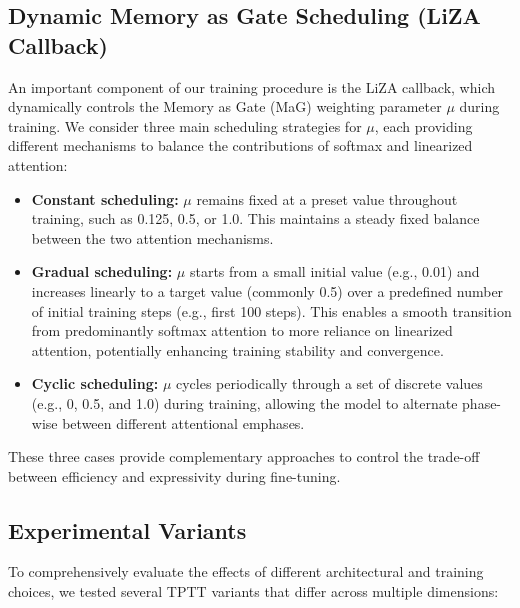 \documentclass[10pt,a4paper]{article}
\begin{document}
\subsection{Dynamic Memory as Gate Scheduling (LiZA Callback)}

An important component of our training procedure is the LiZA callback, which dynamically controls the Memory as Gate (MaG) weighting parameter \(\mu\) during training. We consider three main scheduling strategies for \(\mu\), each providing different mechanisms to balance the contributions of softmax and linearized attention:

\begin{itemize}
    \item \textbf{Constant scheduling:} \(\mu\) remains fixed at a preset value throughout training, such as 0.125, 0.5, or 1.0. This maintains a steady fixed balance between the two attention mechanisms.
    \item \textbf{Gradual scheduling:} \(\mu\) starts from a small initial value (e.g., 0.01) and increases linearly to a target value (commonly 0.5) over a predefined number of initial training steps (e.g., first 100 steps). This enables a smooth transition from predominantly softmax attention to more reliance on linearized attention, potentially enhancing training stability and convergence.
    \item \textbf{Cyclic scheduling:} \(\mu\) cycles periodically through a set of discrete values (e.g., 0, 0.5, and 1.0) during training, allowing the model to alternate phase-wise between different attentional emphases.
\end{itemize}

These three cases provide complementary approaches to control the trade-off between efficiency and expressivity during fine-tuning.

\subsection{Experimental Variants}

To comprehensively evaluate the effects of different architectural and training choices, we tested several TPTT variants that differ across multiple dimensions:
\end{document}
